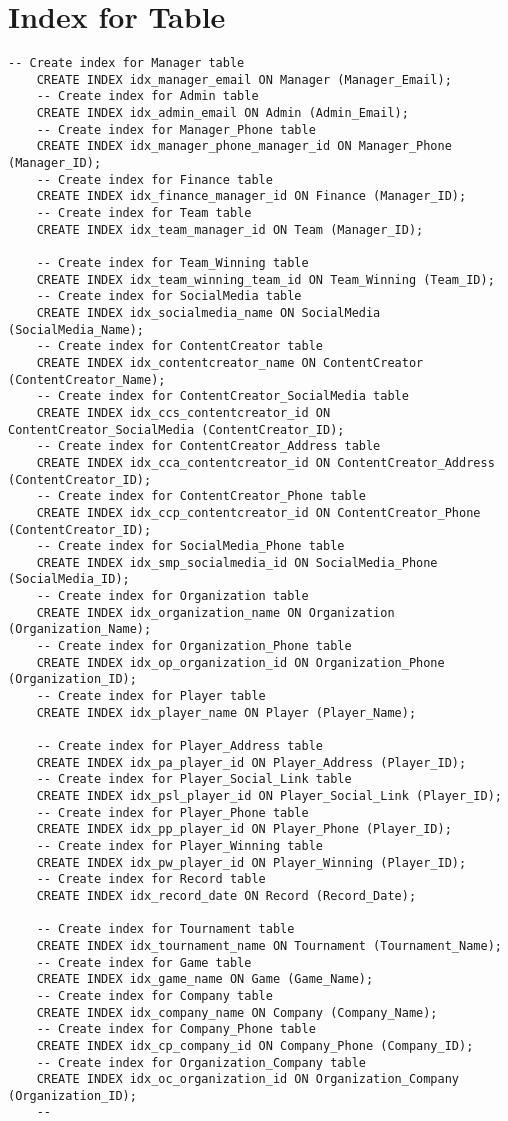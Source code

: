 \section{Index for Table}
\hrulefill
\begin{lstlisting}[caption={Index for Table}, label={lst:index_table}]
    -- Create index for Manager table
    CREATE INDEX idx_manager_email ON Manager (Manager_Email);
    -- Create index for Admin table
    CREATE INDEX idx_admin_email ON Admin (Admin_Email);
    -- Create index for Manager_Phone table
    CREATE INDEX idx_manager_phone_manager_id ON Manager_Phone (Manager_ID);
    -- Create index for Finance table
    CREATE INDEX idx_finance_manager_id ON Finance (Manager_ID);
    -- Create index for Team table
    CREATE INDEX idx_team_manager_id ON Team (Manager_ID);
   
    -- Create index for Team_Winning table
    CREATE INDEX idx_team_winning_team_id ON Team_Winning (Team_ID);
    -- Create index for SocialMedia table
    CREATE INDEX idx_socialmedia_name ON SocialMedia (SocialMedia_Name);
    -- Create index for ContentCreator table
    CREATE INDEX idx_contentcreator_name ON ContentCreator (ContentCreator_Name);
    -- Create index for ContentCreator_SocialMedia table
    CREATE INDEX idx_ccs_contentcreator_id ON ContentCreator_SocialMedia (ContentCreator_ID);
    -- Create index for ContentCreator_Address table
    CREATE INDEX idx_cca_contentcreator_id ON ContentCreator_Address (ContentCreator_ID);
    -- Create index for ContentCreator_Phone table
    CREATE INDEX idx_ccp_contentcreator_id ON ContentCreator_Phone (ContentCreator_ID);
    -- Create index for SocialMedia_Phone table
    CREATE INDEX idx_smp_socialmedia_id ON SocialMedia_Phone (SocialMedia_ID);
    -- Create index for Organization table
    CREATE INDEX idx_organization_name ON Organization (Organization_Name);
    -- Create index for Organization_Phone table
    CREATE INDEX idx_op_organization_id ON Organization_Phone (Organization_ID);
    -- Create index for Player table
    CREATE INDEX idx_player_name ON Player (Player_Name);
   
    -- Create index for Player_Address table
    CREATE INDEX idx_pa_player_id ON Player_Address (Player_ID);
    -- Create index for Player_Social_Link table
    CREATE INDEX idx_psl_player_id ON Player_Social_Link (Player_ID);
    -- Create index for Player_Phone table
    CREATE INDEX idx_pp_player_id ON Player_Phone (Player_ID);
    -- Create index for Player_Winning table
    CREATE INDEX idx_pw_player_id ON Player_Winning (Player_ID);
    -- Create index for Record table
    CREATE INDEX idx_record_date ON Record (Record_Date);
    
    -- Create index for Tournament table
    CREATE INDEX idx_tournament_name ON Tournament (Tournament_Name);
    -- Create index for Game table
    CREATE INDEX idx_game_name ON Game (Game_Name);
    -- Create index for Company table
    CREATE INDEX idx_company_name ON Company (Company_Name);
    -- Create index for Company_Phone table
    CREATE INDEX idx_cp_company_id ON Company_Phone (Company_ID);
    -- Create index for Organization_Company table
    CREATE INDEX idx_oc_organization_id ON Organization_Company (Organization_ID);
    --
\end{lstlisting}
\clearpage